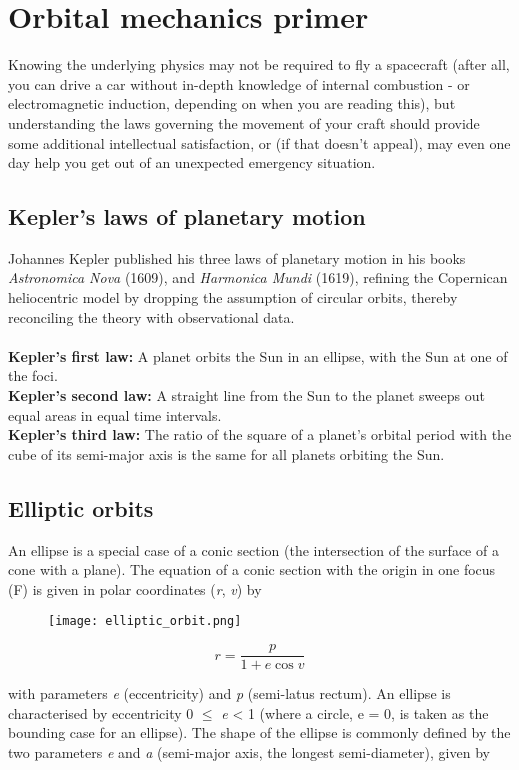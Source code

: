 \documentclass[Orbiter User Manual.tex]{subfiles}
\begin{document}
\section{Orbital mechanics primer}
\label{sec:orb_mech}
Knowing the underlying physics may not be required to fly a spacecraft (after all, you can drive a car without in-depth knowledge of internal combustion - or electromagnetic induction, depending on when you are reading this), but understanding the laws governing the movement of your craft should provide some additional intellectual satisfaction, or (if that doesn't appeal), may even one day help you get out of an unexpected emergency situation.

\subsection{Kepler's laws of planetary motion}
Johannes Kepler published his three laws of planetary motion in his books \textit{Astronomica Nova} (1609), and \textit{Harmonica Mundi} (1619), refining the Copernican heliocentric model by dropping the assumption of circular orbits, thereby reconciling the theory with observational data.\\
\\
\textbf{Kepler's first law:} A planet orbits the Sun in an ellipse, with the Sun at one of the foci.\\
\textbf{Kepler's second law:} A straight line from the Sun to the planet sweeps out equal areas in equal time intervals.\\
\textbf{Kepler's third law:} The ratio of the square of a planet's orbital period with the cube of its semi-major axis is the same for all planets orbiting the Sun.

\subsection{Elliptic orbits}
An ellipse is a special case of a conic section (the intersection of the surface of a cone with a plane). The equation of a conic section with the origin in one focus (F) is given in polar coordinates (\textit{r}, \textit{v}) by

\begin{figure}[H]
	\centering
	\texttt{[image: elliptic\_orbit.png]}
\end{figure}

\[ r = \frac{p}{1 + e \cos v} \]

\noindent
with parameters \textit{e} (eccentricity) and \textit{p} (semi-latus rectum). An ellipse is characterised by eccentricity 0 $\leq$ \textit{e} < 1 (where a circle, e = 0, is taken as the bounding case for an ellipse). The shape of the ellipse is commonly defined by the two parameters \textit{e} and \textit{a} (semi-major axis, the longest semi-diameter), given by
\end{document}
